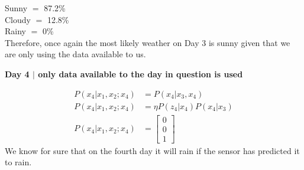 \documentclass[answers]{exam}
\begin{document}
\begin{questions}
\begin{parts}
\begin{solution}
            Sunny $=$ 87.2\% \\ Cloudy $=$ 12.8\% \\ Rainy $=$ 0\% \\

            Therefore, once again the most likely weather on Day 3 is sunny given that we
            are only using the data available to us.

            \textbf{Day 4 $\mid$ only data available to the day in question is used}

            \begin{align*}
                P(x_4 | x_1, x_2;x_4) & = P(x_4 | x_3, x_4)             \\
                P(x_4 | x_1, x_2;x_4) & = \eta P(z_4 | x_4)P(x_4 | x_3) \\
                P(x_4 | x_1, x_2;x_4) & = \begin{bmatrix}
                                              0 \\ 0 \\ 1 \end{bmatrix}
            \end{align*}
            We know for sure that on the fourth day it will rain if the sensor has
            predicted it to rain.


\end{solution}
\end{parts}
\end{questions}
\end{document}
